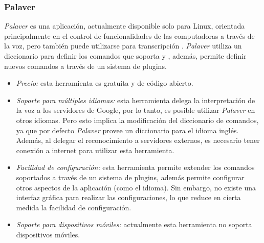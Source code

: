 \subsubsection{Palaver}
\label{sec:palaver}

\emph{Palaver} es una aplicaci\'on, actualmente disponible solo para Linux, orientada principalmente
en el control de funcionalidades de las computadoras a trav\'es de la voz, pero tambi\'en
puede utilizarse para transcripci\'on \cite{Palaver}. \emph{Palaver} utiliza un diccionario para
definir los comandos que soporta y , adem\'as, permite definir nuevos comandos a trav\'es
de un sistema de plugins.

\begin{itemize}
    \item \emph{Precio:} esta herramienta es gratuita y de c\'odigo abierto.
    \item \emph{Soporte para m\'ultiples idiomas:} esta herramienta delega la interpretaci\'on de
	la voz a los servidores de Google, por lo tanto, es posible utilizar \emph{Palaver} en otros idiomas. Pero
	esto implica la modificaci\'on del diccionario de comandos, ya que por defecto \emph{Palaver} provee
	un diccionario para el idioma ingl\'es. Adem\'as, al delegar el reconocimiento a servidores externos, es
    necesario tener conexi\'on a internet para utilizar esta herramienta.
    \item \emph{Facilidad de configuraci\'on:} esta herramienta permite extender los comandos soportados a trav\'es de
	un sistema de plugins, adem\'as permite configurar otros aspectos de la aplicaci\'on (como el idioma). Sin embargo,
	no existe una interfaz gr\'afica para realizar las configuraciones, lo que reduce en cierta medida la facilidad
	de configuraci\'on.
    \item \emph{Soporte para dispositivos m\'oviles:} actualmente esta herramienta no soporta dispositivos m\'oviles.
\end{itemize}
